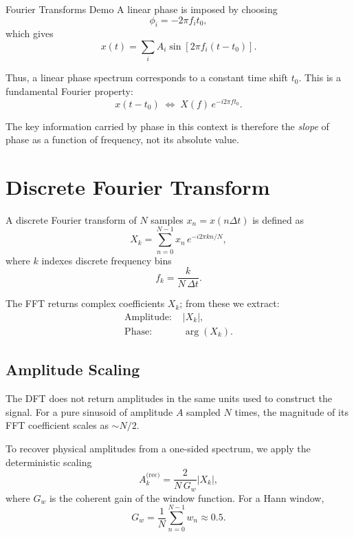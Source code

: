 \begin{activity}{Fourier Transforms Demo}
A linear phase is imposed by choosing
\begin{equation}
\phi_i = -2\pi f_i t_0,
\end{equation}
which gives
\begin{equation}
x(t) = \sum_i A_i \sin\!\left[2\pi f_i (t - t_0)\right].
\end{equation}

Thus, a linear phase spectrum corresponds to a constant time shift $t_0$.
This is a fundamental Fourier property:
\begin{equation}
x(t - t_0) \;\Longleftrightarrow\; X(f)\,e^{-i 2\pi f t_0}.
\end{equation}

The key information carried by phase in this context is therefore the \emph{slope} of phase as a function of frequency, not its absolute value.

\section*{Discrete Fourier Transform}

A discrete Fourier transform of $N$ samples $x_n = x(n\Delta t)$ is defined as
\begin{equation}
X_k = \sum_{n=0}^{N-1} x_n \, e^{-i 2\pi kn/N},
\end{equation}
where $k$ indexes discrete frequency bins
\begin{equation}
f_k = \frac{k}{N\,\Delta t}.
\end{equation}

The FFT returns complex coefficients $X_k$; from these we extract:
\begin{align}
\text{Amplitude: } & |X_k|, \\
\text{Phase: } & \arg(X_k).
\end{align}

\subsection*{Amplitude Scaling}

The DFT does not return amplitudes in the same units used to construct the signal.
For a pure sinusoid of amplitude $A$ sampled $N$ times, the magnitude of its FFT coefficient scales as $\sim N/2$.

To recover physical amplitudes from a one-sided spectrum, we apply the deterministic scaling
\begin{equation}
A_k^{\text{(rec)}} = \frac{2}{N\,G_w} |X_k|,
\end{equation}
where $G_w$ is the coherent gain of the window function.
For a Hann window,
\begin{equation}
G_w = \frac{1}{N} \sum_{n=0}^{N-1} w_n \approx 0.5.
\end{equation}


\end{activity}
